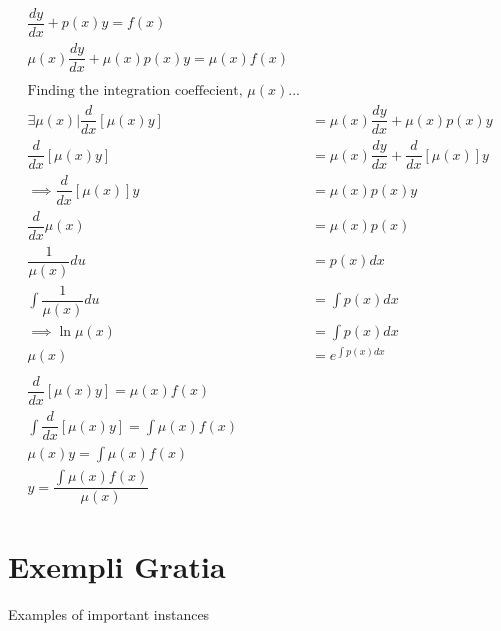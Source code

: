 \documentclass{article}
\begin{document}
\begin{align*}
\dfrac{dy}{dx}+p(x)y=f(x)\\
\mu(x)\dfrac{dy}{dx}+\mu(x)p(x)y=\mu(x)f(x)\\\\
\text{Finding the integration coeffecient, }\mu(x)...\\
\exists\mu(x)|\dfrac{d}{dx}[\mu(x)y]&=\mu(x)\dfrac{dy}{dx}+\mu(x)p(x)y\\
\dfrac{d}{dx}[\mu(x)y]&=\mu(x)\dfrac{dy}{dx}+\dfrac{d}{dx}[\mu(x)]y\\
\implies\dfrac{d}{dx}[\mu(x)]y&=\mu(x)p(x)y\\
\dfrac{d}{dx}\mu(x)&=\mu(x)p(x)\\
\dfrac{1}{\mu(x)}du&=p(x)dx\\
\int\dfrac{1}{\mu(x)}du&=\int p(x)dx\\
\implies \ln\mu(x)&=\int p(x)dx\\
\mu(x)&=e^{\int p(x)dx}\\\\
\dfrac{d}{dx}[\mu(x)y]=\mu(x)f(x)\\
\int\dfrac{d}{dx}[\mu(x)y]=\int\mu(x)f(x)\\
\mu(x)y=\int\mu(x)f(x)\\
y=\dfrac{\int\mu(x)f(x)}{\mu(x)}
\end{align*}

\section{Exempli Gratia}

Examples of important instances
\end{document}
